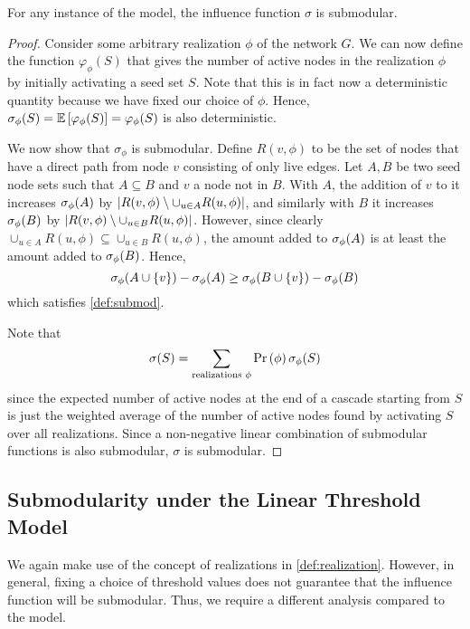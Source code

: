 \begin{theorem}
    For any instance of the \icmodel{} model, the influence function $\sigma$ is submodular.
    \label{thm:ic_submod}
\end{theorem}
\begin{proof}
    Consider some arbitrary realization $\phi$ of the network $G$. We can now define the function 
    $\varphi_{\phi}(S)$ that gives the number of active nodes in the realization $\phi$ by initially activating a seed set $S$. Note that this is in fact now a deterministic quantity because we have fixed our choice of $\phi$. Hence, $\sigma_{\phi} \! \left( S \right) = \operatorname*{\mathbb{E}} \left[  \varphi_{\phi} \! \left( S \right)  \right] = \varphi_{\phi} \! \left( S \right)$ is also deterministic. 
    
    We now show that $\sigma_{\phi}$ is submodular. Define $R(v, \phi)$ to be the set of nodes that have a direct path from node $v$ consisting of only live edges. Let $A, B$ be two seed node sets such that $A \subseteq B$ and $v$ a node not in $B$. With $A$, the addition of $v$ to it increases $\sigma_{\phi} \! \left( A \right)$ by $\left\lvert R(v, \phi) \setminus \cup_{u\in A} R(u, \phi) \right\rvert$, 
    and similarly with $B$ it increases $\sigma_{\phi} \! \left( B \right)$ by $\left\lvert R(v, \phi) \setminus \cup_{u\in B} R(u, \phi) \right\rvert$. However, since clearly $\cup_{u\in A} R(u, \phi) \subseteq \cup_{u\in B} R(u, \phi)$, the amount added to $\sigma_{\phi} \! \left( A \right)$ is at least the amount added to $\sigma_{\phi} \! \left( B \right)$. Hence, 
    \begin{equation*}
        \sigma_{\phi} \! \left( A \cup \left\{ v \right\} \right) - \sigma_{\phi} \! \left( A \right) \geq \sigma_{\phi} \! \left( B \cup \left\{ v \right\} \right) - \sigma_{\phi} \! \left( B \right)
    \end{equation*}
    which satisfies \cref{def:submod}. 
    
    Note that 
    \begin{equation*}
        \sigma \! \left( S \right) = \sum_{\text{realizations } \phi} \Pr \left( \phi \right) \sigma_{\phi} \! \left( S \right)
    \end{equation*}
    since the expected number of active nodes at the end of a cascade starting from $S$ is just the weighted average of the number of active nodes found by activating $S$ over all realizations. Since a non-negative linear combination of submodular functions is also submodular, $\sigma$ is submodular. 
\end{proof}

\subsection{Submodularity under the Linear Threshold Model}
We again make use of the concept of realizations in \cref{def:realization}. 
However, in general, fixing a choice of threshold values does not guarantee that the influence 
function will be submodular. Thus, we require a different analysis compared to the \icmodel{} model.

